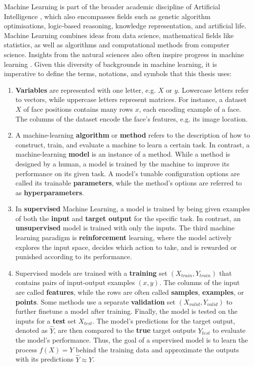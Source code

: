 \newpar Machine Learning is part of the broader academic discipline of Artificial Intelligence \cite{ai-review-2008}, which also encompasses fields such as genetic algorithm optimisations, logic-based reasoning, knowledge representation, and artificial life. Machine Learning combines ideas from data science, mathematical fields like statistics, as well as algorithms and computational methods from computer science. Insights from the natural sciences also often inspire progress in machine learning \cite{biological-dnn-2021}. Given this diversity of backgrounds in machine learning, it is imperative to define the terms, notations, and symbols that this thesis uses:
\begin{enumerate}
    \item \textbf{Variables} are represented with one letter, e.g. $X$ or $y$. Lowercase letters refer to vectors, while uppercase letters represent matrices. For instance, a dataset $X$ of face positions contains many rows $x$, each encoding example of a face. The columns of the dataset encode the face's features, e.g. its image location.
    \item A machine-learning \textbf{algorithm} or \textbf{method} refers to the description of how to construct, train, and evaluate a machine to learn a certain task. In contrast, a machine-learning \textbf{model} is an instance of a method. While a method is designed by a human, a model is trained by the machine to improve its performance on its given task. A model's tunable configuration options are called its trainable \textbf{parameters}, while the method's options are referred to as \textbf{hyperparameters}.
    \item In \textbf{supervised} Machine Learning, a model is trained by being given examples of both the \textbf{input} and \textbf{target output} for the specific task. In contrast, an \textbf{unsupervised} model is trained with only the inputs. The third machine learning paradigm is \textbf{reinforcement} learning, where the model actively explores the input space, decides which action to take, and is rewarded or punished according to its performance.
    \item Supervised models are trained with a \textbf{training} set $(X_{train}, Y_{train})$ that contains pairs of input-output examples $(x, y)$. The columns of the input are called \textbf{features}, while the rows are often called \textbf{samples}, \textbf{examples}, or \textbf{points}. Some methods use a separate \textbf{validation} set $(X_{valid}, Y_{valid})$ to further finetune a model after training. Finally, the model is tested on the inputs for a \textbf{test} set $X_{test}$. The model's predictions for the target output, denoted as $\hat{Y}$, are then compared to the \textbf{true} target outputs $Y_{test}$ to evaluate the model's performance. Thus, the goal of a supervised model is to learn the process $f(X) = Y$ behind the training data and approximate the outputs with its predictions $\hat{Y} \approx Y$.

\end{enumerate}

